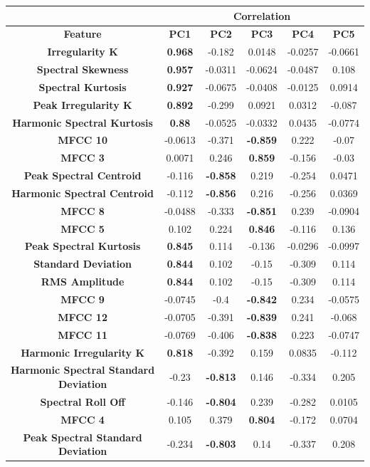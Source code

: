 		\begin{table}
			\centering
			\begin{tabular}{|c|c|c|c|c|c|}
				\cline{2-6}
				\multicolumn{1}{c}{} & \multicolumn{5}{|c|}{\bf{Correlation}} \tabularnewline
				\hline
				\bf{Feature} & \bf{PC1} & \bf{PC2} & \bf{PC3} & \bf{PC4} & \bf{PC5} \tabularnewline
				\hline
				\hline
				\bf{Irregularity K} & \bf{0.968} & -0.182 & 0.0148 & -0.0257 & -0.0661 \tabularnewline
				\hline
				\bf{Spectral Skewness} & \bf{0.957} & -0.0311 & -0.0624 & -0.0487 & 0.108 \tabularnewline
				\hline
				\bf{Spectral Kurtosis} & \bf{0.927} & -0.0675 & -0.0408 & -0.0125 & 0.0914 \tabularnewline
				\hline
				\bf{Peak Irregularity K} & \bf{0.892} & -0.299 & 0.0921 & 0.0312 & -0.087 \tabularnewline
				\hline
				\bf{Harmonic Spectral Kurtosis} & \bf{0.88} & -0.0525 & -0.0332 & 0.0435 & -0.0774 \tabularnewline
				\hline
				\bf{MFCC 10} & -0.0613 & -0.371 & \bf{-0.859} & 0.222 & -0.07 \tabularnewline
				\hline
				\bf{MFCC 3} & 0.0071 & 0.246 & \bf{0.859} & -0.156 & -0.03 \tabularnewline
				\hline
				\bf{Peak Spectral Centroid} & -0.116 & \bf{-0.858} & 0.219 & -0.254 & 0.0471 \tabularnewline
				\hline
				\bf{Harmonic Spectral Centroid} & -0.112 & \bf{-0.856} & 0.216 & -0.256 & 0.0369 \tabularnewline
				\hline
				\bf{MFCC 8} & -0.0488 & -0.333 & \bf{-0.851} & 0.239 & -0.0904 \tabularnewline
				\hline
				\bf{MFCC 5} & 0.102 & 0.224 & \bf{0.846} & -0.116 & 0.136 \tabularnewline
				\hline
				\bf{Peak Spectral Kurtosis} & \bf{0.845} & 0.114 & -0.136 & -0.0296 & -0.0997 \tabularnewline
				\hline
				\bf{Standard Deviation} & \bf{0.844} & 0.102 & -0.15 & -0.309 & 0.114 \tabularnewline
				\hline
				\bf{RMS Amplitude} & \bf{0.844} & 0.102 & -0.15 & -0.309 & 0.114 \tabularnewline
				\hline
				\bf{MFCC 9} & -0.0745 & -0.4 & \bf{-0.842} & 0.234 & -0.0575 \tabularnewline
				\hline
				\bf{MFCC 12} & -0.0705 & -0.391 & \bf{-0.839} & 0.241 & -0.068 \tabularnewline
				\hline
				\bf{MFCC 11} & -0.0769 & -0.406 & \bf{-0.838} & 0.223 & -0.0747 \tabularnewline
				\hline
				\bf{Harmonic Irregularity K} & \bf{0.818} & -0.392 & 0.159 & 0.0835 & -0.112 \tabularnewline
				\hline
				\bf{Harmonic Spectral Standard Deviation} & -0.23 & \bf{-0.813} & 0.146 & -0.334 & 0.205 \tabularnewline
				\hline
				\bf{Spectral Roll Off} & -0.146 & \bf{-0.804} & 0.239 & -0.282 & 0.0105 \tabularnewline
				\hline
				\bf{MFCC 4} & 0.105 & 0.379 & \bf{0.804} & -0.172 & 0.0704 \tabularnewline
				\hline
				\bf{Peak Spectral Standard Deviation} & -0.234 & \bf{-0.803} & 0.14 & -0.337 & 0.208 \tabularnewline
				\hline
			\end{tabular}
		\end{table}


